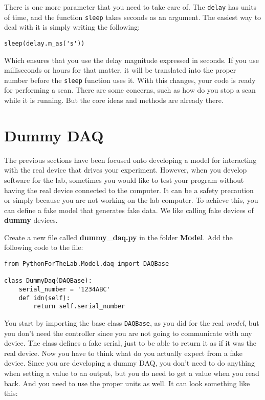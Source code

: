 {There is one more parameter that you need to take care of. The
\texttt{delay} has units of time, and the function \texttt{sleep} takes
seconds as an argument. The easiest way to deal with it is simply
writing the following:

\begin{verbatim}
sleep(delay.m_as('s'))
\end{verbatim}

Which ensures that you use the delay magnitude expressed in seconds. If
you use milliseconds or hours for that matter, it will be translated
into the proper number before the \texttt{sleep} function uses it. With
this changes, your code is ready for performing a scan. There are some
concerns, such as how do you stop a scan while it is running. But the
core ideas and methods are already there.

\section{Dummy DAQ}\label{dummy-daq}
The previous sections have been focused onto developing a model for interacting with the real device that drives your experiment. However, when you develop software for the lab, sometimes you would like to test your program without having the real device
connected to the computer. It can be a safety precaution or simply because you are not working on the lab computer. To achieve this, you
can define a fake model that generates fake data. We like calling fake devices of \textbf{dummy} devices. 

Create a new file called \textbf{dummy\_daq.py} in the folder \textbf{Model}. Add the following code to the file:

\begin{verbatim}
from PythonForTheLab.Model.daq import DAQBase

class DummyDaq(DAQBase):
    serial_number = '1234ABC'
    def idn(self):
        return self.serial_number
\end{verbatim}

You start by importing the base class \texttt{DAQBase}, as you did for
the real \emph{model}, but you don't need the controller since you are
not going to communicate with any device. The class defines a fake
serial, just to be able to return it as if it was the real device. Now
you have to think what do you actually expect from a fake device. Since
you are developing a dummy {DAQ}, you don't need to do anything when
setting a value to an output, but you do need to get a value when you
read back. And you need to use the proper units as well. It can look
something like this:

}
